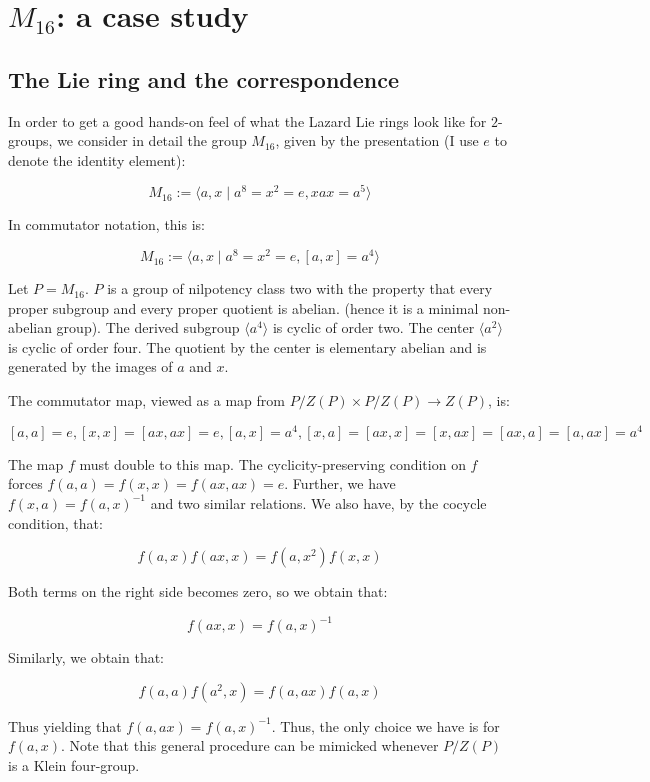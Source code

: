 \documentclass[10pt]{amsart}
\begin{document}
\section{$M_{16}$: a case study}

\subsection{The Lie ring and the correspondence}

In order to get a good hands-on feel of what the Lazard Lie rings look
like for $2$-groups, we consider in detail the group $M_{16}$, given
by the presentation (I use $e$ to denote the identity element):

$$M_{16} := \langle a, x \mid a^8 = x^2 = e, xax = a^5 \rangle$$

In commutator notation, this is:

$$M_{16} := \langle a,x \mid a^8 = x^2 = e, [a,x] = a^4 \rangle$$

Let $P = M_{16}$. $P$ is a group of nilpotency class two with the
property that every proper subgroup and every proper quotient is
abelian. (hence it is a minimal non-abelian group). The derived
subgroup $\langle a^4 \rangle$ is cyclic of order two. The center
$\langle a^2 \rangle$ is cyclic of order four. The quotient by the
center is elementary abelian and is generated by the images of $a$ and
$x$.

The commutator map, viewed as a map from $P/Z(P) \times P/Z(P) \to
Z(P)$, is:

$$[a,a] = e, [x,x] = [ax,ax] = e, [a,x] = a^4, [x,a] = [ax,x] = [x,ax] = [ax,a] = [a,ax] = a^4$$

The map $f$ must double to this map. The cyclicity-preserving
condition on $f$ forces $f(a,a) = f(x,x) = f(ax,ax) = e$. Further, we have
$f(x,a) = f(a,x)^{-1}$ and two similar relations. We also have, by the
cocycle condition, that:

$$f(a,x)f(ax,x) = f(a,x^2)f(x,x)$$

Both terms on the right side becomes zero, so we obtain that:

$$f(ax,x) = f(a,x)^{-1}$$

Similarly, we obtain that:

$$f(a,a)f(a^2,x) = f(a,ax)f(a,x)$$

Thus yielding that $f(a,ax) = f(a,x)^{-1}$. Thus, the only choice we
have is for $f(a,x)$. Note that this general procedure can be mimicked
whenever $P/Z(P)$ is a Klein four-group.
\end{document}
